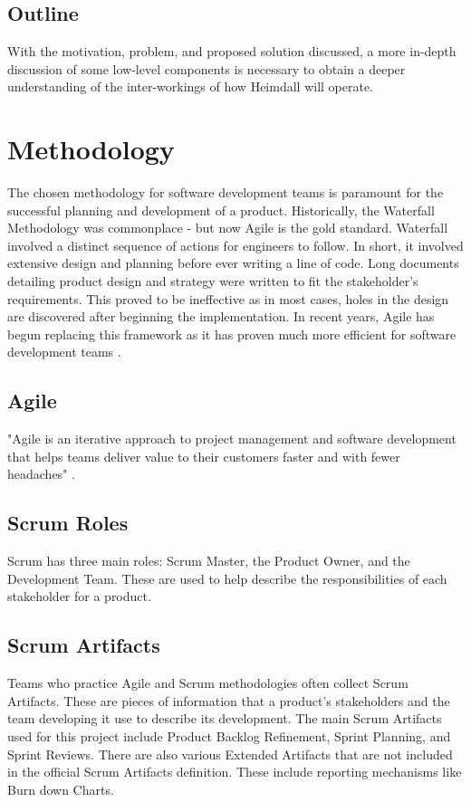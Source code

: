 \documentclass{article}
\begin{document}
\subsection{Outline}
With the motivation, problem, and proposed solution discussed, a more in-depth discussion of some low-level components is necessary to obtain a deeper understanding of the inter-workings of how Heimdall will operate.


\section{Methodology}
The chosen methodology for software development teams is paramount for the successful planning and development of a product. Historically, the Waterfall Methodology was commonplace - but now Agile is the gold standard. Waterfall involved a distinct sequence of actions for engineers to follow. In short, it involved extensive design and planning before ever writing a line of code. Long documents detailing product design and strategy were written to fit the stakeholder's requirements. This proved to be ineffective as in most cases, holes in the design are discovered after beginning the implementation. In recent years, Agile has begun replacing this framework as it has proven much more efficient for software development teams \cite{agile-waterfall}.



\subsection{Agile}
"Agile is an iterative approach to project management and software development that helps teams deliver value to their customers faster and with fewer headaches" \cite{what-is-agile}. 



\subsection{Scrum Roles}
Scrum has three main roles: Scrum Master, the Product Owner, and the Development Team. These are used to help describe the responsibilities of each stakeholder for a product.



\subsection{Scrum Artifacts}
Teams who practice Agile and Scrum methodologies often collect Scrum Artifacts. These are pieces of information that a product's stakeholders and the team developing it use to describe its development. The main Scrum Artifacts used for this project include Product Backlog Refinement, Sprint Planning, and Sprint Reviews. There are also various Extended Artifacts that are not included in the official Scrum Artifacts definition. These include reporting mechanisms like Burn down Charts.
\end{document}
